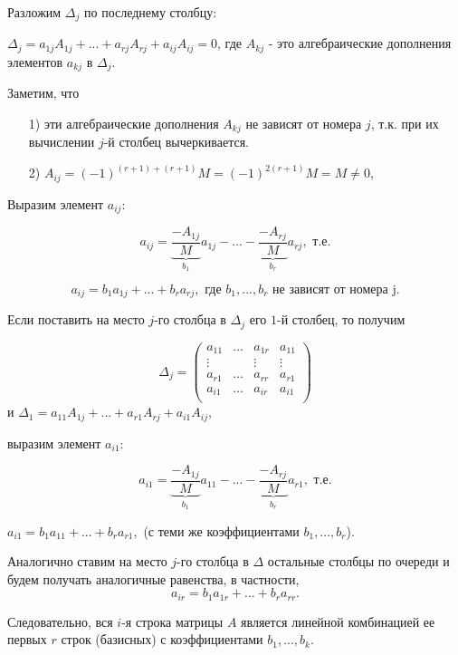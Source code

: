 \begin{enumerate}
Разложим $\Delta_j$ по последнему столбцу:

$\Delta_j = a_{1j}A_{1j} + ... + a_{rj}A_{rj} + a_{ij}A_{ij} = 0$, где $A_{kj}$ - это алгебраические дополнения элементов $a_{kj}$ в $\Delta_j$.

Заметим, что
\begin{enumerate}
    \item[1)] эти алгебраические дополнения $A_{kj}$ не зависят от номера $j$, т.к. при их вычислении $j$-й столбец вычеркивается.
    \item[2)] $A_{ij} = (-1)^{(r + 1) + (r + 1)}M = (-1)^{2(r + 1)}M = M \ne 0,$
\end{enumerate}

Выразим элемент $a_{ij}:$

$$a_{ij} = \underbrace{\frac{-A_{1j}}{M}}_{b_1}a_{1j} - ... - \underbrace{\frac{-A_{rj}}{M}}_{b_r}a_{rj}, \text{ т.е.}$$ 

$$a_{ij} = b_1a_{1j} + ... + b_ra_{rj}, \text{ где } b_1, ..., b_r \text{ не зависят от номера j.}$$ 

Если поставить на место $j$-го столбца в $\Delta_j$ его $1$-й столбец, то получим

$$
\Delta_j = 
\begin{pmatrix}
    a_{11}&\ldots&a_{1r}&a_{11}\\
    \vdots&&\vdots&\vdots\\
    a_{r1}&\ldots&a_{rr}&a_{r1}\\
    a_{i1}&\ldots&a_{ir}&a_{i1}\\
\end{pmatrix}
$$
и $\Delta_1 = a_{11}A_{1j} + ... + a_{r1}A_{rj} + a_{i1}A_{ij},$

выразим элемент $a_{i1}:$

$$a_{i1} = \underbrace{\frac{-A_{1j}}{M}}_{b_1}a_{11} - ... - \underbrace{\frac{-A_{rj}}{M}}_{b_r}a_{r1},\text{ т.е.}$$ 

$a_{i1} = b_1a_{11} + ... + b_ra_{r1}, $ (с теми же коэффициентами $b_1, ..., b_r$).

Аналогично ставим на место $j$-го столбца в $\Delta$ остальные столбцы по очереди и будем получать аналогичные равенства, в частности,
$$a_{ir} = b_1a_{1r} + ... + b_ra_{rr}.$$

Следовательно, вся $i$-я строка матрицы $A$ является линейной комбинацией ее первых $r$ строк (базисных) с коэффициентами $b_1, ..., b_k$.

\end{enumerate}

